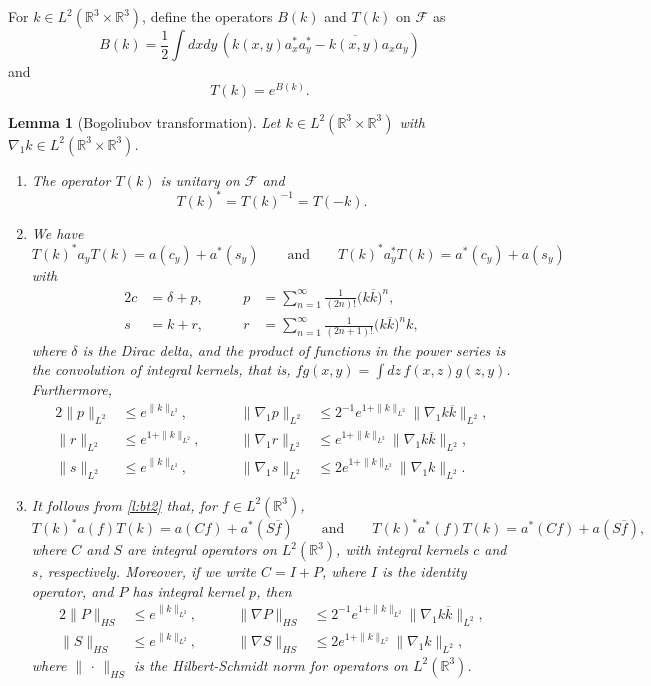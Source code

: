 \documentclass[11pt,a4paper]{scrartcl}
\newtheorem{lem}[thm]{Lemma}
\newcommand{\R}{\mathds{R}}
\begin{document}
For $k \in L^2(\R^3 \times \R^3)$, define the operators $B(k)$ and $T(k)$ on
$\mathcal{F}$ as
\[
  B(k) = \frac{1}{2} \int dxdy \, (k(x,y) a_x^* a_y^* - \overline{k(x,y)} a_x
  a_y)
\]
and
\[
  T(k) = e^{B(k)}.
\]


\begin{lem}[Bogoliubov transformation] \label{l:bt}
  Let $k \in L^2(\R^3 \times \R^3)$ with $\nabla_1 k \in L^2(\R^3 \times
  \R^3)$.
  \begin{enumerate}
    \item \label{l:bt1} The operator $T(k)$ is unitary on $\mathcal{F}$ and
      \[
        T(k)^* = T(k)^{-1} = T(-k).
      \]
    \item \label{l:bt2} We have
      \[
        T(k)^* a_y T(k) = a(c_y) + a^*(s_y) \qquad \text{and} \qquad T(k)^*
        a_y^* T(k) = a^*(c_y) + a(s_y)
      \]
      with
      \begin{alignat*}{2}
        c & = \delta + p, & \qquad p & = \sum_{n=1}^\infty \frac{1}{(2n)!}
        \big( k \overline{k} \big)^n, \\
        s & = k + r, & \qquad r & = \sum_{n=1}^\infty \frac{1}{(2n+1)!} \big(
        k \overline{k} \big)^n k,
      \end{alignat*}
      where $\delta$ is the Dirac delta, and the product of functions in the
      power series is the convolution of integral kernels, that is, $fg(x,y) =
      \int dz \, f(x,z) g(z,y)$. Furthermore,
      \begin{alignat*}{2}
        \| p \|_{L^2} & \le e^{\| k \|_{L^2}}, \qquad & \| \nabla_1 p \|_{L^2}
        & \le 2^{-1} e^{1 + \| k \|_{L^2}} \| \nabla_1 k \overline{k}
        \|_{L^2}, \\
        \| r \|_{L^2} & \le e^{1 + \| k \|_{L^2}}, \qquad & \| \nabla_1 r
        \|_{L^2} & \le e^{1 + \| k \|_{L^2}} \| \nabla_1 k \overline{k}
        \|_{L^2}, \\
        \| s \|_{L^2} & \le e^{\| k \|_{L^2}}, \qquad & \| \nabla_1 s \|_{L^2}
        & \le 2 e^{1+\| k \|_{L^2}} \| \nabla_1 k \|_{L^2}.
      \end{alignat*}
    \item \label{l:bt3} It follows from \ref{l:bt2} that, for $f \in
      L^2(\R^3)$,
      \[
        T(k)^* a(f) T(k) = a(Cf) + a^*(S\overline{f}) \qquad \text{and} \qquad
        T(k)^* a^*(f) T(k) = a^*(Cf) + a(S\overline{f}),
      \]
      where $C$ and $S$ are integral operators on $L^2(\R^3)$, with integral
      kernels $c$ and $s$, respectively. Moreover, if we write $C = I + P$,
      where $I$ is the identity operator, and $P$ has integral kernel $p$,
      then
      \begin{alignat*}{2}
        \| P \|_{HS} & \le e^{\| k \|_{L^2}}, \qquad & \| \nabla P \|_{HS} &
        \le 2^{-1} e^{1+ \| k \|_{L^2}} \| \nabla_1 k \overline{k} \|_{L^2},
        \\
        \| S \|_{HS} & \le e^{\| k \|_{L^2}}, \qquad & \| \nabla S \|_{HS} &
        \le 2e^{1+\| k \|_{L^2}} \| \nabla_1 k \|_{L^2},
      \end{alignat*}
      where $\| \, \cdot \, \|_{HS}$ is the Hilbert-Schmidt norm for operators
      on $L^2(\R^3)$.
  \end{enumerate}
\end{lem}
\end{document}
